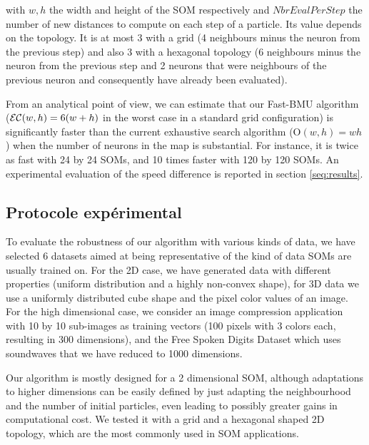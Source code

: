 	with $w, h$ the width and height of the SOM respectively and $NbrEvalPerStep$ the number of new distances to compute on each step of a particle. Its value depends on the topology. It is at most 3 with a grid (4 neighbours minus the neuron from the previous step) and also 3 with a hexagonal topology (6 neighbours minus the neuron from the previous step and 2 neurons that were neighbours of the previous neuron and consequently have already been evaluated). 

	From an analytical point of view, we can estimate that our Fast-BMU algorithm (${\cal EC}(w,h)=6(w+h)$ in the worst case in a standard grid configuration) is significantly faster than the current exhaustive search algorithm (O$(w,h) = wh$) when the number of neurons in the map is substantial. For instance, it is twice as fast with 24 by 24 SOMs, and 10 times faster with 120 by 120 SOMs. An experimental evaluation of the speed difference is reported in section \ref{seq:results}.

	\subsection{Protocole expérimental}

	To evaluate the robustness of our algorithm with various kinds of data, we have selected 6 datasets aimed at being representative of the kind of data SOMs are usually trained on. For the 2D case, we have generated data with different properties (uniform distribution and a highly non-convex shape), for 3D data we use a uniformly distributed cube shape and the pixel color values of an image. For the high dimensional case, we consider an image compression application \cite{amerijckx2003image} with 10 by 10 sub-images as training vectors (100 pixels with 3 colors each, resulting in 300 dimensions), and the Free Spoken Digits Dataset \cite{zohar_jackson_2018_1342401} which uses soundwaves that we have reduced to 1000 dimensions.

	Our algorithm is mostly designed for a 2 dimensional SOM, although adaptations to higher dimensions can be easily defined by just adapting the neighbourhood and the number of initial particles, even leading to possibly greater gains in computational cost. We tested it with a grid and a hexagonal shaped 2D topology, which are the most commonly used in SOM applications. 

